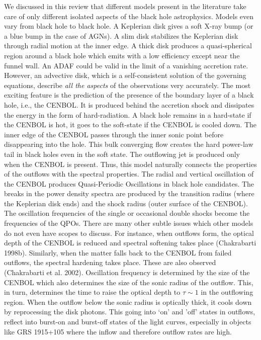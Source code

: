 \documentclass{ws-procs975x65}
\begin{document}
We discussed in this review that different models present in the literature take care of 
only different isolated aspects of the black hole astrophysics. Models even vary from black hole
to black hole. A Keplerian disk gives a
soft X-ray bump (or a blue bump in the case of AGNs). A slim disk stabilizes the Keplerian disk
through radial motion at the inner edge. A thick disk produces a quasi-spherical region around 
a black hole which emits with a low efficiency except near the funnel wall. An ADAF could be 
valid in the limit of a vanishing accretion rate. However, an advective disk, which is 
a self-consistent solution of the governing equations, describe {\it all the aspects} of
the observations very accurately. The most exciting feature is the prediction of the
presence of the boundary layer
of a black hole, i.e., the CENBOL. It is produced behind the accretion shock and dissipates the
energy in the form of hard-radiation. A black hole remains in a hard-state if the CENBOL 
is hot, it goes to the soft-state if the CENBOL is cooled down. The inner edge of 
the CENBOL passes through the inner sonic point before disappearing into the hole. 
This bulk converging flow creates the hard power-law tail in black holes even in the 
soft state. The outflowing jet is produced only when the CENBOL is present. Thus,
this model naturally connects the properties of the outflows with the spectral properties.
The radial and vertical oscillation of the CENBOL produces Quasi-Periodic Oscillations
in black hole candidates. The breaks in the power density spectra are produced by the 
transition radius (where the Keplerian disk ends) and the shock radius (outer surface 
of the CENBOL). The oscillation frequencies of the single or occasional double shocks
become the frequencies of the QPOs. There are many other subtle issues which other models
do not even have scopes to discuss. For instance, when outflows form, the optical depth
of the CENBOL is reduced and spectral softening takes place (Chakrabarti 1998b). Similarly, when the
matter falls back to the CENBOL from failed outflows, the spectral hardening takes place.
These are also observed (Chakrabarti et al. 2002). Oscillation frequency is determined 
by the size of the CENBOL which also determines the size of the sonic radius of the outflow.
This, in turn, determines the time to raise the optical depth to $\tau\sim 1$ in the
outflowing  region. When the outflow below the sonic radius is optically thick, it cools down
by reprocessing the disk photons. This going into `on' and 'off' states in outflows, reflect into
burst-on and burst-off states of the light curves, especially in objects like GRS 1915+105
where the inflow and therefore outflow rates are high. 
\end{document}
